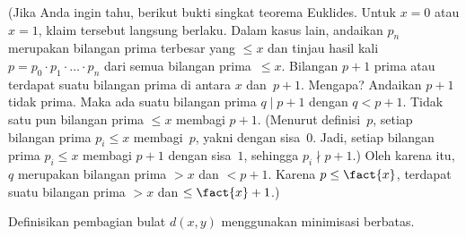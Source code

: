 \documentclass[../../../include/open-logic-section]{subfiles}
\begin{document}
(Jika Anda ingin tahu, berikut bukti singkat teorema Euklides. Untuk $x=0$
atau $x=1$, klaim tersebut langsung berlaku. Dalam kasus lain, andaikan $p_n$
merupakan bilangan prima terbesar yang $\le x$ dan tinjau hasil kali
$p=p_0\cdot p_1\cdot\dots\cdot p_n$ dari semua bilangan prima~$\le x$.
Bilangan $p+1$ prima atau terdapat suatu bilangan prima di antara $x$
dan~$p+1$. Mengapa? Andaikan $p+1$ tidak prima. Maka ada suatu bilangan prima
$q \mid p+1$ dengan $q<p+1$. Tidak satu pun bilangan prima $\le x$ membagi
$p+1$. (Menurut definisi~$p$, setiap bilangan prima $p_i\le x$ membagi~$p$,
yakni dengan sisa~$0$. Jadi, setiap bilangan prima $p_i\le x$ membagi $p+1$
dengan sisa~$1$, sehingga $p_i\nmid p+1$.) Oleh karena itu, $q$ merupakan
bilangan prima $>x$ dan $<p+1$. Karena $p\le\fact{x}$, terdapat suatu bilangan
prima $>x$ dan $\le\fact{x}+1$.)

\begin{prob}
Definisikan pembagian bulat $d(x,y)$ menggunakan minimisasi berbatas.
\end{prob}
\end{document}
